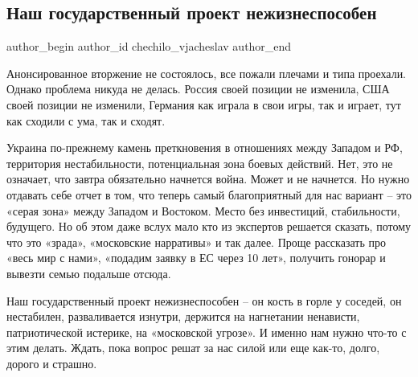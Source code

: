  
 
 
 
 
 
\subsection{Наш государственный проект нежизнеспособен}
\label{sec:17_02_2022.fb.chechilo_vjacheslav.1.gosproekt}
 
\ifcmt
 author_begin
   author_id chechilo_vjacheslav
 author_end
\fi

Анонсированное вторжение не состоялось, все пожали плечами и типа проехали.
Однако проблема никуда не делась. Россия своей позиции не изменила, США своей
позиции не изменили, Германия как играла в свои игры, так и играет, тут как
сходили с ума, так и сходят. 

Украина по-прежнему камень преткновения в отношениях между Западом и РФ,
территория нестабильности, потенциальная зона боевых действий. Нет, это не
означает, что завтра обязательно начнется война. Может и не начнется. Но нужно
отдавать себе отчет в том, что теперь самый благоприятный для нас вариант – это
«серая зона» между Западом и Востоком. Место без инвестиций, стабильности,
будущего. Но об этом даже вслух мало кто из экспертов решается сказать, потому
что это «зрада», «московские нарративы» и так далее. Проще рассказать про «весь
мир с нами», «подадим заявку в ЕС через 10 лет», получить гонорар и вывезти
семью подальше отсюда. 

Наш государственный проект нежизнеспособен – он кость в горле у соседей, он
нестабилен, разваливается изнутри, держится на нагнетании ненависти,
патриотической истерике, на «московской угрозе». И именно нам нужно что-то с
этим делать. Ждать, пока вопрос решат за нас силой или еще как-то, долго,
дорого и страшно.
